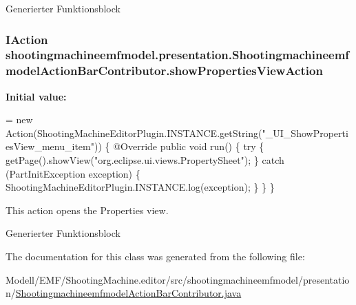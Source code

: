 Generierter Funktionsblock \hypertarget{classshootingmachineemfmodel_1_1presentation_1_1_shootingmachineemfmodel_action_bar_contributor_ad15b135c1fbf377999142897559c8f80}{
\subsubsection[{show\-Properties\-View\-Action}]{\setlength{\rightskip}{0pt plus 5cm}I\-Action shootingmachineemfmodel.\-presentation.\-Shootingmachineemfmodel\-Action\-Bar\-Contributor.\-show\-Properties\-View\-Action\hspace{0.3cm}{\ttfamily [protected]}}}\label{classshootingmachineemfmodel_1_1presentation_1_1_shootingmachineemfmodel_action_bar_contributor_ad15b135c1fbf377999142897559c8f80}
{\bfseries Initial value\-:}
\begin{DoxyCode}
=
        \textcolor{keyword}{new} Action(ShootingMachineEditorPlugin.INSTANCE.getString(\textcolor{stringliteral}{"\_UI\_ShowPropertiesView\_menu\_item"})) \{
            @Override
            \textcolor{keyword}{public} \textcolor{keywordtype}{void} run() \{
                \textcolor{keywordflow}{try} \{
                    getPage().showView(\textcolor{stringliteral}{"org.eclipse.ui.views.PropertySheet"});
                \}
                \textcolor{keywordflow}{catch} (PartInitException exception) \{
                    ShootingMachineEditorPlugin.INSTANCE.log(exception);
                \}
            \}
        \}
\end{DoxyCode}
This action opens the Properties view.

Generierter Funktionsblock 

The documentation for this class was generated from the following file\-:\begin{DoxyCompactItemize}
\item 
Modell/\-E\-M\-F/\-Shooting\-Machine.\-editor/src/shootingmachineemfmodel/presentation/\hyperlink{_shootingmachineemfmodel_action_bar_contributor_8java}{Shootingmachineemfmodel\-Action\-Bar\-Contributor.\-java}\end{DoxyCompactItemize}
